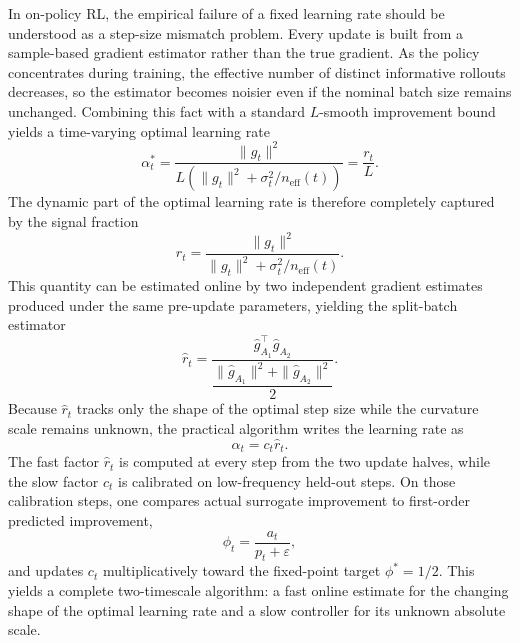 \documentclass[11pt]{article}
\begin{document}
In on-policy RL, the empirical failure of a fixed learning rate should be understood as a step-size mismatch problem. Every update is built from a sample-based gradient estimator rather than the true gradient. As the policy concentrates during training, the effective number of distinct informative rollouts decreases, so the estimator becomes noisier even if the nominal batch size remains unchanged. Combining this fact with a standard $L$-smooth improvement bound yields a time-varying optimal learning rate
\[
\alpha_t^* = \frac{\|g_t\|^2}{L\left(\|g_t\|^2 + \sigma_t^2/n_{\mathrm{eff}}(t)\right)} = \frac{r_t}{L}.
\]
The dynamic part of the optimal learning rate is therefore completely captured by the signal fraction
\[
r_t = \frac{\|g_t\|^2}{\|g_t\|^2 + \sigma_t^2/n_{\mathrm{eff}}(t)}.
\]
This quantity can be estimated online by two independent gradient estimates produced under the same pre-update parameters, yielding the split-batch estimator
\[
\hat r_t
=
\frac{\hat g_{A_1}^\top \hat g_{A_2}}{\dfrac{\|\hat g_{A_1}\|^2+\|\hat g_{A_2}\|^2}{2}}.
\]
Because $\hat r_t$ tracks only the shape of the optimal step size while the curvature scale remains unknown, the practical algorithm writes the learning rate as
\[
\alpha_t = c_t\hat r_t.
\]
The fast factor $\hat r_t$ is computed at every step from the two update halves, while the slow factor $c_t$ is calibrated on low-frequency held-out steps. On those calibration steps, one compares actual surrogate improvement to first-order predicted improvement,
\[
\phi_t = \frac{a_t}{p_t+\varepsilon},
\]
and updates $c_t$ multiplicatively toward the fixed-point target $\phi^*=1/2$. This yields a complete two-timescale algorithm: a fast online estimate for the changing shape of the optimal learning rate and a slow controller for its unknown absolute scale.
\end{document}
